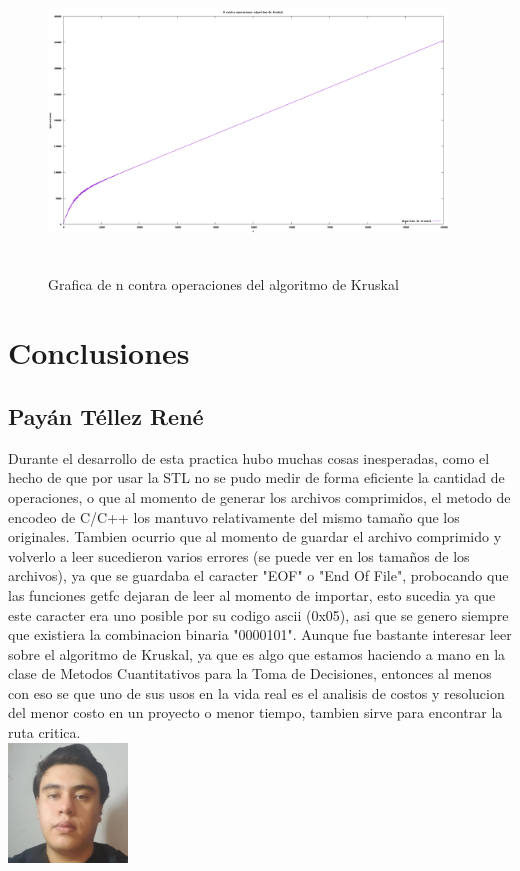\documentclass[spanish]{article}
\begin{document}
	\begin{figure}[H]
		\centering
		\includegraphics[width=400px,height=300px]{grafica13}
		\caption{Grafica de n contra operaciones del algoritmo de Kruskal}
	\end{figure}
	\section{Conclusiones}			
	\subsection{Payán Téllez René}
	Durante el desarrollo de esta practica hubo muchas cosas inesperadas, como el hecho de que por usar la STL no se pudo medir de forma eficiente la cantidad de operaciones, o que al momento de generar los archivos comprimidos, el metodo de encodeo de C/C++ los mantuvo relativamente del mismo tamaño que los originales. Tambien ocurrio que al momento de guardar el archivo comprimido y volverlo a leer sucedieron varios errores (se puede ver en los tamaños de los archivos), ya que se guardaba el caracter "EOF" o "End Of File", probocando que las funciones getfc dejaran de leer al momento de importar, esto sucedia ya que este caracter era uno posible por su codigo ascii (0x05), asi que se genero siempre que existiera la combinacion binaria "0000101". Aunque fue bastante interesar leer sobre el algoritmo de Kruskal, ya que es algo que estamos haciendo a mano en la clase de Metodos Cuantitativos para la Toma de Decisiones, entonces al menos con eso se que uno de sus usos en la vida real es el analisis de costos y resolucion del menor costo en un proyecto o menor tiempo, tambien sirve para encontrar la ruta critica. \\
	\includegraphics[height=120px,width=120px]{Rene}
\end{document}
